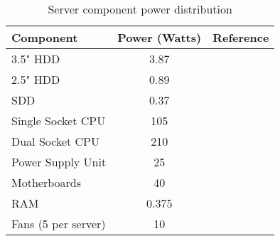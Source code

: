 \begin{table}[h]
\centering
\begin{tabular}{|l|c|c|} \hline

\bf{Component} & \bf{Power (Watts)} & \bf{Reference} \\ \hline 

3.5" HDD & 3.87 & \cite{fuchs219} \\ \hline
2.5" HDD & 0.89 & \cite{fuchs219} \\ \hline
SDD & 0.37 & \cite{fuchs219} \\ \hline
Single Socket CPU & 105 & \cite{kaggle17b} \\ \hline
Dual Socket CPU & 210 & \cite{kaggle17b} \\ \hline
Power Supply Unit & 25 & \cite{joshi12} \\ \hline
Motherboards & 40 & \cite{buildcomputers} \\ \hline
RAM & 0.375 & \cite{crucial} \\ \hline
Fans (5 per server) & 10 & \cite{buildcomputers} \\ \hline


\hline\end{tabular}
\caption{Server component power distribution}
\label{tab:it_component_power_dist_table}
\end{table}